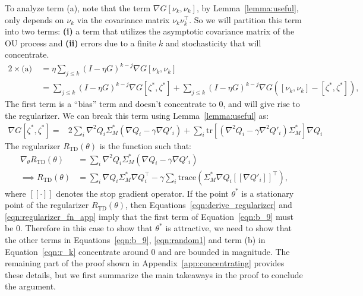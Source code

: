 To analyze term (a), note that the term $\nabla G [\nu_k, \nu_k]$, by Lemma~\ref{lemma:useful}, only depends on $\nu_k$ via the covariance matrix $\nu_k \nu_k^\top$. So we will partition this term into two terms: \textbf{(i)} a term that utilizes the asymptotic covariance matrix of the OU process and \textbf{(ii)} errors due to a finite $k$ and stochasticity that will concentrate.
\begin{align}
    2 \times \text{(a)}~ &= \eta  \sum_{j \leq k} (I - \eta G)^{k - j} \nabla G [\nu_k, \nu_k]\\
    \label{eqn:random1}
    &= \sum_{j \leq k} (I - \eta G)^{k - j} \nabla G [\zeta^*, \zeta^*] + \sum_{j \leq k} (I - \eta G)^{k - j} \nabla G ([\nu_k, \nu_k] - [\zeta^*, \zeta^*]),
\end{align}
The first term is a ``bias'' term and doesn't concentrate to $0$, and will give rise to the regularizer. We can break this term using Lemma~\ref{lemma:useful} as:
\begin{align}
\label{eqn:b_9}
   \!\!\!\!\!\!\!\!\!\!\!\!\nabla G [\zeta^*, \zeta^*] =& 2 \sum_i \nabla^2 Q_i \Sigma^*_M (\nabla Q_i - \gamma \nabla Q'_i) + \sum_i \mathrm{tr}\left[(\nabla^2 Q_i - \gamma \nabla^2 Q'_i) \Sigma^*_M \right] \nabla Q_i 
\end{align}
The regularizer $R_\mathrm{TD}(\theta)$ is the function such that:
\begin{align}
    \label{eqn:derive_regularizer}
    \nabla_\theta R_\mathrm{TD}(\theta) & = \sum_i \nabla^2 Q_i \Sigma^*_M (\nabla Q_i - \gamma \nabla Q'_i)\\
    \label{eqn:regularizer_fn_app}
    \implies R_\mathrm{TD}(\theta) &= \sum_i \nabla Q_i \Sigma^*_M \nabla Q_i^\top - \gamma \sum_i \mathrm{trace}\left(\Sigma^*_M \nabla Q_i [[\nabla Q'_i]]^\top\right),
\end{align}
where $[[\cdot]]$ denotes the stop gradient operator. If the point $\theta^*$ is a stationary point of the regularizer $R_\mathrm{TD}(\theta)$, then Equations~\ref{eqn:derive_regularizer} and \ref{eqn:regularizer_fn_app} imply that the first term of Equation~\ref{eqn:b_9} must be 0. Therefore in this case to show that $\theta^*$ is attractive, we need to show that the other terms in Equations~\ref{eqn:b_9}, \ref{eqn:random1} and term (b) in Equation~\ref{eqn:r_k} concentrate around $0$ and are bounded in magnitude. The remaining part of the proof shown in Appendix~\ref{app:concentrating} provides these details, but we first summarize the main takeaways in the proof to conclude the argument.

